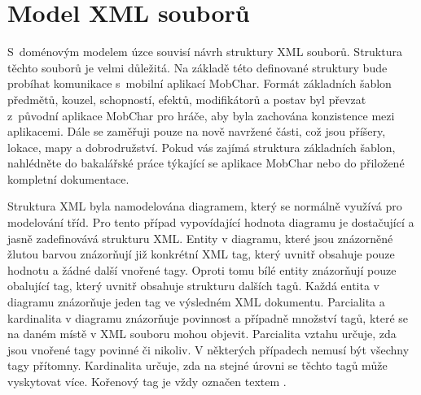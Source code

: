 \documentclass[thesis=B,czech]{resources/FITthesis}[2012/06/26]
\begin{document}
	\section{Model XML souborů}
S~doménovým modelem úzce souvisí návrh struktury XML souborů. Struktura těchto souborů je velmi důležitá. Na základě této definované struktury bude probíhat komunikace s~mobilní aplikací MobChar. Formát základních šablon předmětů, kouzel, schopností, efektů, modifikátorů a postav byl převzat z~původní aplikace MobChar pro hráče, aby byla zachována konzistence mezi aplikacemi. Dále se zaměřuji pouze na nově navržené části, což jsou příšery, lokace, mapy a dobrodružství. Pokud vás zajímá struktura základních šablon, nahlédněte do bakalářské práce týkající se aplikace MobChar\cite{Weberova_2017} nebo do přiložené kompletní dokumentace.\par

Struktura XML byla namodelována diagramem, který se normálně využívá pro modelování tříd. Pro tento případ vypovídající hodnota diagramu je dostačující a jasně zadefinovává strukturu XML. Entity v diagramu, které jsou znázorněné žlutou barvou znázorňují již konkrétní XML tag, který uvnitř obsahuje pouze hodnotu a žádné další vnořené tagy. Oproti tomu bílé entity znázorňují pouze obalující tag, který uvnitř obsahuje strukturu dalších tagů. Každá entita v diagramu znázorňuje jeden tag ve výsledném XML dokumentu. Parcialita a kardinalita v diagramu znázorňuje povinnost a případně množství tagů, které se na daném místě v XML souboru mohou objevit. Parcialita vztahu určuje, zda jsou vnořené tagy povinné či nikoliv. V některých případech nemusí být všechny tagy přítomny. Kardinalita určuje, zda na stejné úrovni se těchto tagů může vyskytovat více. Kořenový tag je vždy označen textem   .
\end{document}

